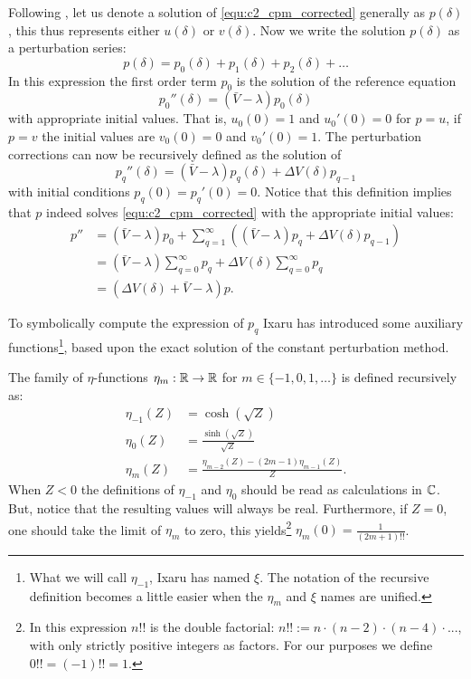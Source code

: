 Following \cite{ixaru_numerical_1984,ixaru_cp_2000}, let us denote a solution of \eqref{equ:c2_cpm_corrected} generally as $p(\delta)$, this thus represents either $u(\delta)$ or $v(\delta)$. Now we write the solution $p(\delta)$ as a perturbation series:
$$
    p(\delta) = p_0(\delta) + p_1(\delta) + p_2(\delta) + \dots
$$
In this expression the first order term $p_0$ is the solution of the reference equation
\begin{equation}\label{equ:c2_p0_reference}
    p_0''(\delta) = (\bar{V} - \lambda) p_0(\delta)
\end{equation}
with appropriate initial values. That is, $u_0(0) = 1$ and $u_0'(0) = 0$ for $p = u$, if $p=v$ the initial values are $v_0(0)=0$ and $v_0'(0) = 1$. The perturbation corrections can now be recursively defined as the solution of
\begin{equation}\label{equ:c2_pq_definition}
    p_q''(\delta) = (\bar{V} - \lambda) p_q(\delta) + \Delta V(\delta) p_{q-1}
\end{equation}
with initial conditions $p_q(0) = p_q'(0) = 0$. Notice that this definition implies that $p$ indeed solves \eqref{equ:c2_cpm_corrected} with the appropriate initial values:
\begin{align*}
    p'' & = (\bar{V} - \lambda)p_0 + \sum_{q=1}^\infty\left((\bar{V} - \lambda)p_q + \Delta V(\delta) p_{q-1}\right) \\
        & = (\bar{V} - \lambda)\sum_{q=0}^\infty p_q + \Delta V(\delta) \sum_{q=0}^\infty p_q                        \\
        & = (\Delta V(\delta) + \bar{V} - \lambda)p\text{.}
\end{align*}

To symbolically compute the expression of $p_q$ Ixaru has introduced some auxiliary functions\footnote{What we will call $\eta_{-1}$, Ixaru has named $\xi$. The notation of the recursive definition becomes a little easier when the $\eta_m$ and $\xi$ names are unified.}, based upon the exact solution of the constant perturbation method.

\begin{definition}[Ixaru 1984]\label{def:c2_eta_functions}
    The family of $\eta$-functions $\eta_m : \mathbb{R} \to \mathbb{R}$ for $m \in \{-1, 0, 1, \dots\}$ is defined recursively as:
    \begin{align*}
        \eta_{-1}(Z) & = \cosh(\sqrt{Z})                                        \\
        \eta_{0}(Z)  & = \frac{\sinh(\sqrt{Z})}{\sqrt{Z}}                       \\
        \eta_{m}(Z)  & = \frac{\eta_{m-2}(Z) - (2m-1) \eta_{m-1}(Z)}{Z}\text{.}
    \end{align*}
    When $Z < 0$ the definitions of $\eta_{-1}$ and $\eta_{0}$ should be read as calculations in $\mathbb{C}$. But, notice that the resulting values will always be real. Furthermore, if $Z = 0$, one should take the limit of $\eta_m$ to zero, this yields\footnote{In this expression $n!!$ is the double factorial: $n!! := n\cdot (n-2) \cdot (n - 4) \cdot ...$, with only strictly positive integers as factors. For our purposes we define $0!! = (-1)!! = 1$.} $\eta_m(0) = \frac{1}{(2m+1)!!}$.
\end{definition}

